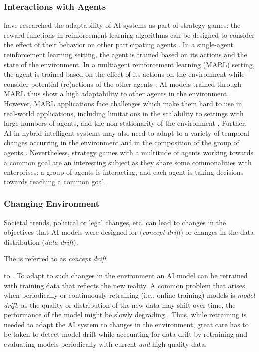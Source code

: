 \subsubsection{Interactions with Agents}

\cite{madeiraDesigningReinforcementLearningBased2006} have researched the adaptability of AI 
systems as part of strategy games: the reward functions in reinforcement learning algorithms can be designed to consider
the effect of their behavior on other participating agents \citep{madeiraDesigningReinforcementLearningBased2006}.
In a single-agent reinforcement learning setting, the agent is trained based on its actions and the state of the
environment. In a multiagent reinforcement learning (MARL) setting, the agent is trained based on the effect of its
actions on the environment while consider potential (re)actions of the other agents \citep{caneseMultiAgentReinforcementLearning2021}.
AI models trained through MARL thus show a high adaptability to other agents in the environment. However, MARL applications
face challenges which make them hard to use in real-world applications, including limitations in the scalability to settings
with large numbers of agents, and the non-stationarity of the environment \citep{caneseMultiAgentReinforcementLearning2021}. 
Further, AI in hybrid intelligent systems may also need to adapt to a variety of temporal changes occurring in the environment
and in the composition of the group of agents \citep{akataResearchAgendaHybrid2020}. Nevertheless, strategy games with a
multitude of agents working towards a common goal are an interesting subject as they share some commonalities with enterprises:
a group of agents is interacting, and each agent is taking decisions towards reaching a common goal.


\subsubsection{Changing Environment}

Societal trends, political or legal changes, etc. can lead to changes in the objectives that AI models were designed for
(\textit{concept drift}) or changes in the data distribution (\textit{data drift}). 

The 
is referred to as \textit{concept drift} \citep{luDatadrivenDecisionSupport2020}


to . To adapt to such changes in the environment an AI model can
be retrained with training data that reflects the new reality. A common problem that arises when periodically or continuously
retraining (i.e., online training) models is \textit{model drift}: as the quality or distribution of the new data may shift
over time, the performance of the model might be slowly degrading \citep{nelsonEvaluatingModelDrift2015}. Thus, while retraining
is needed to adapt the AI system to changes in the environment, great care has to be taken to detect model drift while accounting
for data drift by retraining and evaluating models periodically with current \textit{and} high quality data.


